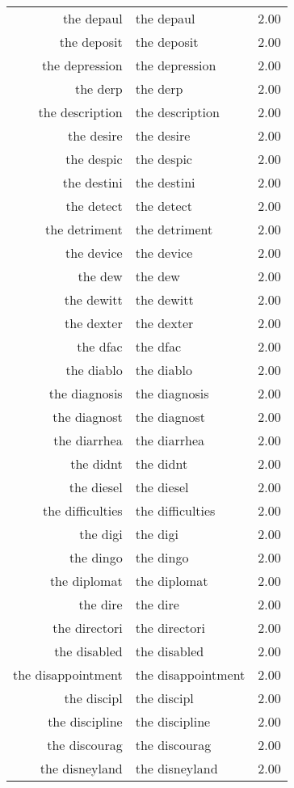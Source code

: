 \begin{table}[ht]
\begin{tabular}{rlr}
  the depaul & the depaul & 2.00 \\ 
  the deposit & the deposit & 2.00 \\ 
  the depression & the depression & 2.00 \\ 
  the derp & the derp & 2.00 \\ 
  the description & the description & 2.00 \\ 
  the desire & the desire & 2.00 \\ 
  the despic & the despic & 2.00 \\ 
  the destini & the destini & 2.00 \\ 
  the detect & the detect & 2.00 \\ 
  the detriment & the detriment & 2.00 \\ 
  the device & the device & 2.00 \\ 
  the dew & the dew & 2.00 \\ 
  the dewitt & the dewitt & 2.00 \\ 
  the dexter & the dexter & 2.00 \\ 
  the dfac & the dfac & 2.00 \\ 
  the diablo & the diablo & 2.00 \\ 
  the diagnosis & the diagnosis & 2.00 \\ 
  the diagnost & the diagnost & 2.00 \\ 
  the diarrhea & the diarrhea & 2.00 \\ 
  the didnt & the didnt & 2.00 \\ 
  the diesel & the diesel & 2.00 \\ 
  the difficulties & the difficulties & 2.00 \\ 
  the digi & the digi & 2.00 \\ 
  the dingo & the dingo & 2.00 \\ 
  the diplomat & the diplomat & 2.00 \\ 
  the dire & the dire & 2.00 \\ 
  the directori & the directori & 2.00 \\ 
  the disabled & the disabled & 2.00 \\ 
  the disappointment & the disappointment & 2.00 \\ 
  the discipl & the discipl & 2.00 \\ 
  the discipline & the discipline & 2.00 \\ 
  the discourag & the discourag & 2.00 \\ 
  the disneyland & the disneyland & 2.00 \\ 

\end{tabular}
\end{table}
